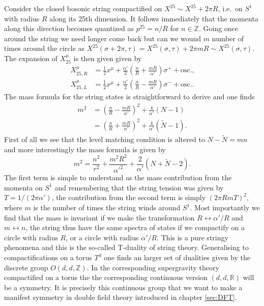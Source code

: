Consider the closed bosonic string compactified on $X^{25}\sim X^{25}+2\pi R$, i.e.\ on $S^1$ with radius $R$ along its 25th dimension. It follows immediately that the momenta along this direction becomes quantized as $p^{25}=n/R$ for $n\in \mathbb{Z}$. Going once around the string we need longer come back but can we wound $m$ number of times around the circle as $X^{25}(\sigma+2\pi,\tau)=X^{25}(\sigma,\tau)+2\pi mR\sim X^{25}(\sigma,\tau)$. The expansion of $X_{25}^\mu$ is then given given by 
\begin{equation}
    \begin{aligned}
        X^\mu_{25,R}&=\frac{1}{2}x^\mu+\frac{\alpha'}{2}\left(\frac{n}{R}+\frac{mR}{\alpha'}\right)\sigma^++\text{osc.,}\\
        X^\mu_{25,L}&=\frac{1}{2}x^\mu+\frac{\alpha'}{2}\left(\frac{n}{R}-\frac{mR}{\alpha'}\right)\sigma^-+\text{osc.}.
    \end{aligned}
\end{equation}
The mass formula for the string states is straightforward to derive and one finds
\begin{equation}
    \begin{aligned}
    m^2 &= \left(\frac{n}{R}-\frac{mR}{\alpha'}\right)^2+\frac{4}{\alpha'}\left(N-1\right)\\
        &= \left(\frac{n}{R}+\frac{mR}{\alpha'}\right)^2+\frac{4}{\alpha'}\left(\tilde{N}-1\right).
    \end{aligned}
\end{equation}
First of all we see that the level matching condition is altered to $N-\tilde{N}=mn$ and more interestingly the mass formula is given by 
\begin{equation}
    m^2 = \frac{n^2}{r^2}+\frac{m^2R^2}{\alpha'^2}+\frac{2}{\alpha'}(N+\tilde{N}-2).
\end{equation}
The first term is simple to understand as the mass contribution from the momenta on $S^1$ and remembering that the string tension was given by $T=1/(2\pi\alpha')$, the contribution from the second term is simply $(2\pi RmT)^2$, where $m$ is the number of times the string winds around $S^1$. Most importantly we find that the mass is invariant if we make the transformation $R\leftrightarrow\alpha'/R$ and $m\leftrightarrow n$, the string thus have the same spectra of states if we compactify on a circle with radius $R$, or a circle with radius $\alpha'/R$. This is a pure stringy phenomena and this is the so-called T-duality of string theory. Generalising to compactifications on a torus $T^d$ one finds an larger set of dualities given by the discrete group $O(d,d,\mathbb{Z})$. In the corresponding supergravity theory compactified on a torus the the corresponding continuous version $(d,d,\mathbb{R})$ will be a symmetry. It is precisely this continuous group that we want to make a manifest symmetry in double field theory introduced in chapter \ref{sec:DFT}.

